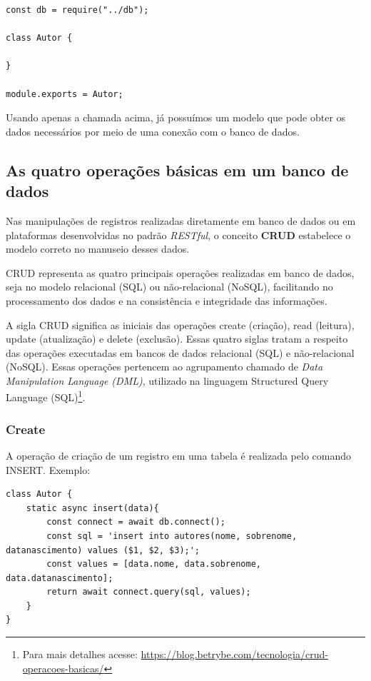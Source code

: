 \begin{verbatim}
const db = require("../db");

class Autor { 

}

module.exports = Autor;
\end{verbatim}

Usando apenas a chamada acima, já possuímos um modelo que pode obter os dados necessários por meio de uma conexão com o banco de dados. 

\subsection{As quatro operações básicas em um banco de dados}\label{sub:crud}

Nas manipulações de registros realizadas diretamente em banco de dados ou em plataformas desenvolvidas no padrão \textit{RESTful}, o conceito \textbf{CRUD} estabelece o modelo correto no manuseio desses dados.

CRUD representa as quatro principais operações realizadas em banco de dados, seja no modelo relacional (SQL) ou não-relacional (NoSQL), facilitando no processamento dos dados e na consistência e integridade das informações.

A sigla CRUD significa as iniciais das operações create (criação), read (leitura), update (atualização) e delete (exclusão). Essas quatro siglas tratam a respeito das operações executadas em bancos de dados relacional (SQL) e não-relacional (NoSQL). Essas operações pertencem ao agrupamento chamado de \textit{Data Manipulation Language (DML)}, utilizado na linguagem Structured Query Language (SQL)\footnote{Para mais detalhes acesse: \url{https://blog.betrybe.com/tecnologia/crud-operacoes-basicas/}}.

\subsubsection{Create}

A operação de criação de um registro em uma tabela é realizada pelo comando INSERT. Exemplo:

\begin{verbatim}
class Autor {
	static async insert(data){
		const connect = await db.connect();
		const sql = 'insert into autores(nome, sobrenome, datanascimento) values ($1, $2, $3);';
		const values = [data.nome, data.sobrenome, data.datanascimento];
		return await connect.query(sql, values);
	}
}
\end{verbatim}

